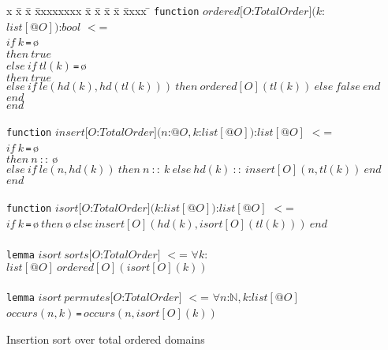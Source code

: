 \documentclass{article}
\theoremstyle{remark}
\theoremstyle{definition}
\newcommand{\iif}{\mathit{if}\ }
\newcommand{\ithen}{\mathit{then}\ }
\newcommand{\ielse}{\mathit{else}\ }
\newcommand{\iend}{\mathit{end}\ }
\newcommand{\ifalse}{\mathit{false}\ }
\newcommand{\itrue}{\mathit{true}\ }
\newcommand{\ieq}{\,\texttt{=}\,}
\newcommand{\nat}{\mathbb{N}}
\newcommand{\name}[1]{\mathit{#1}}
\begin{document}
\begin{figure}[t]

\begin{tabbing}
x \= x \= x \= xxxxxxxx \= x \= x \= x \= x \= xxxx \= \kill
\texttt{function} $\name{ordered}[O$:$\name{TotalOrder}](k$:$\name{list}[@O])$:$\name{bool}$ $<$=\\
$\iif k$\ieq$\mbox{\o}$ \\
\> $\ithen \itrue$ \\
\> $\ielse \iif \name{tl}(k)$\ieq$\mbox{\o}$ \\
\> \> $\ithen \itrue$ \\
\> \> $\ielse \iif \name{le}(\name{hd}(k),\name{hd}(\name{tl}(k)))\ \ithen \name{ordered}[O](\name{tl}(k))\ \ielse \ifalse \iend $ \\
\> $\iend$ \\
$\iend$ \\
\\
\texttt{function} $\name{insert}[O$:$\name{TotalOrder}](n$:$@O, k$:$\name{list}[@O])$:$\name{list}[@O]$ $<$= \\
$\iif k$\ieq$\mbox{\o}$\\
\> $\ithen n\ \name{::}\ \mbox{\o}$ \\
\> $\ielse \iif \name{le}(n,\name{hd}(k))\ \ithen n\ \name{::}\ k\ \ielse \name{hd}(k)\ \name{::}\ \name{insert}[O](n, \name{tl}(k))\ \iend$ \\
$\iend$ \\
\\
\texttt{function} $\name{isort}[O$:$\name{TotalOrder}](k$:$\name{list}[@O])$:$\name{list}[@O]$ $<$= \\
$\iif k$\ieq$\mbox{\o}\ \ithen \mbox{\o}\ \ielse \name{insert}[O](\name{hd}(k), \name{isort}[O](\name{tl}(k)))\ \iend$ \\
\\
\texttt{lemma} $\name{isort}\ \name{sorts}[O$:$\name{TotalOrder}]$ $<$= $\forall k$:$\name{list}[@O]\ \name{ordered}[O](\name{isort}[O](k))$ \\
\\
\texttt{lemma} $\name{isort}\ \name{permutes}[O$:$\name{TotalOrder}]$ $<$= $\forall n$:$\nat, k$:$\name{list}[@O]$\\
\> $\name{occurs}(n, k)$\ieq$\name{occurs}(n, \name{isort}[O](k))$
\end{tabbing}

\caption{Insertion sort over total ordered domains} \label{fig:isort:abstr}
\end{figure}
\end{document}
